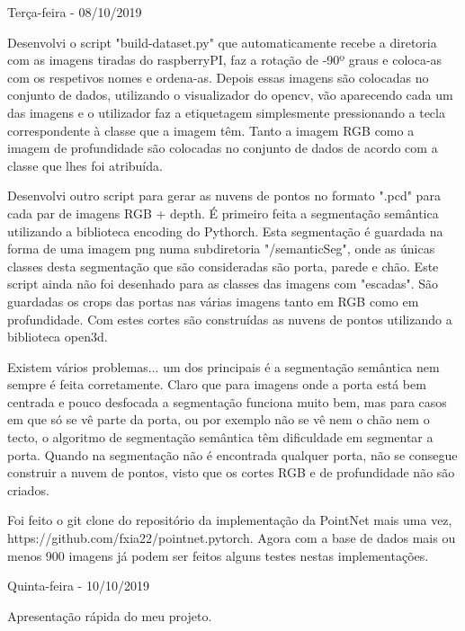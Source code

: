         \bigskip
        
        Terça-feira - 08/10/2019
        
        Desenvolvi o script "build-dataset.py" que automaticamente recebe a diretoria com as imagens tiradas do raspberryPI, faz a rotação de -90º graus e coloca-as com os respetivos nomes e ordena-as.
        Depois essas imagens são colocadas no conjunto de dados, utilizando o visualizador do opencv, vão aparecendo cada um das imagens e o utilizador faz a etiquetagem simplesmente pressionando a tecla correspondente à classe que a imagem têm. Tanto a imagem RGB como a imagem de profundidade são colocadas no conjunto de dados de acordo com a classe que lhes foi atribuída.
        
        Desenvolvi outro script para gerar as nuvens de pontos no formato ".pcd" para cada par de imagens RGB + depth. É primeiro feita a segmentação semântica utilizando a biblioteca encoding do Pythorch. Esta segmentação é guardada na forma de uma imagem png numa subdiretoria "/semanticSeg", onde as únicas classes desta segmentação que são consideradas são porta, parede e chão. Este script ainda não foi desenhado para as classes das imagens com "escadas". São guardadas os crops das portas nas várias imagens tanto em RGB como em profundidade. Com estes cortes são construídas as nuvens de pontos utilizando a biblioteca open3d.
        
        Existem vários problemas... um dos principais é a segmentação semântica nem sempre é feita corretamente. Claro que para imagens onde a porta está bem centrada e pouco desfocada a segmentação funciona muito bem, mas para casos em que só se vê parte da porta, ou por exemplo não se vê nem o chão nem o tecto, o algoritmo de segmentação semântica têm dificuldade em segmentar a porta. Quando na segmentação não é encontrada qualquer porta, não se consegue construir a nuvem de pontos, visto que os cortes RGB e de profundidade não são criados.
        
        Foi feito o git clone do repositório da implementação da PointNet mais uma vez, https://github.com/fxia22/pointnet.pytorch. Agora com a base de dados mais ou menos 900 imagens já podem ser feitos alguns testes nestas implementações.
        

        
        
        
        Quinta-feira - 10/10/2019
        
        Apresentação rápida do meu projeto.
        

